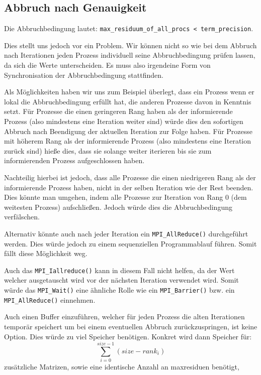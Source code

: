 \documentclass[12pt]{article}
\begin{document}
\begin{sloppypar}
\subsection{Abbruch nach Genauigkeit}
Die Abbruchbedingung lautet: \verb|max_residuum_of_all_procs < term_precision|.

\hspace*{2em}

Dies stellt uns jedoch vor ein Problem. Wir können nicht so wie bei dem Abbruch nach Iterationen jeden Prozess individuell seine Abbruchbedingung prüfen lassen, da sich die Werte unterscheiden. Es muss also irgendeine Form von Synchronisation der Abbruchbedingung stattfinden.

\hspace*{2em}

Als Möglichkeiten haben wir uns zum Beispiel überlegt, dass ein Prozess wenn er lokal die Abbruchbedingung erfüllt hat, die anderen Prozesse davon in Kenntnis setzt. Für Prozesse die einen geringeren Rang haben als der informierende Prozess (also mindestens eine Iteration weiter sind) würde dies den sofortigen Abbruch nach Beendigung der aktuellen Iteration zur Folge haben. Für Prozesse mit höherem Rang als der informierende Prozess (also mindestens eine Iteration zurück sind) hieße dies, dass sie solange weiter iterieren bis sie zum informierenden Prozess aufgeschlossen haben.

Nachteilig hierbei ist jedoch, dass alle Prozesse die einen niedrigeren Rang als der informierende Prozess haben, nicht in der selben Iteration wie der Rest beenden. Dies könnte man umgehen, indem alle Prozesse zur Iteration von Rang 0 (dem weitesten Prozess) aufschließen. Jedoch würde dies die Abbruchbedingung verfälschen.

\hspace*{2em}

Alternativ könnte auch nach jeder Iteration ein \verb|MPI_AllReduce()| durchgeführt werden. Dies würde jedoch zu einem sequenziellen Programmablauf führen. Somit fällt diese Möglichkeit weg. 

Auch das \verb|MPI_Iallreduce()| kann in diesem Fall nicht helfen, da der Wert welcher ausgetauscht wird vor der nächsten Iteration verwendet wird. Somit würde das \verb|MPI_Wait()| eine ähnliche Rolle wie ein \verb|MPI_Barrier()| bzw. ein \verb|MPI_AllReduce()| einnehmen.

\hspace*{2em}

Auch einen Buffer einzuführen, welcher für jeden Prozess die alten Iterationen temporär speichert um bei einem eventuellen Abbruch zurückzuspringen, ist keine Option. Dies würde zu viel Speicher benötigen. Konkret wird dann Speicher für:
\begin{equation*}
    \sum_{i=0}^{size-1}{(size - rank_i)}
\end{equation*}
zusätzliche Matrizen, sowie eine identische Anzahl an maxresiduen benötigt,


\end{sloppypar}
\end{document}
